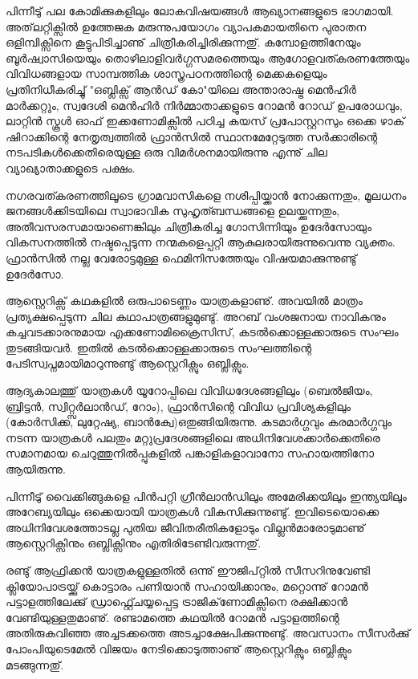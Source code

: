 പിന്നീടു് പല കോമിക്കുകളിലും ലോകവിഷയങ്ങള്‍ ആഖ്യാനങ്ങളുടെ ഭാഗമായി. അത്‌ലറ്റിക്സില്‍ ഉത്തേജക 
മരുന്നുപയോഗം വ്യാപകമായതിനെ പുരാതന ഒളിമ്പിക്സിനെ കൂട്ടുപിടിച്ചാണു് ചിത്രീകരിച്ചിരിക്കുന്നതു്. കമ്പോളത്തിനേയും 
ബൂര്‍ഷ്വാസിയെയും തൊഴിലാളിവര്‍ഗ്ഗസമരത്തെയും ആഗോളവത്കരണത്തേയും വിവിധങ്ങളായ സാമ്പത്തിക 
ശാസ്ത്രപഠനത്തിന്റെ മെക്കകളെയും പ്രതിനിധീകരിച്ചു് "ഒബ്ലിക്സ് ആന്‍ഡ് കോ"യിലെ അന്താരാഷ്ട്ര മെന്‍ഹിര്‍ മാര്‍ക്കറ്റും, 
സ്വദേശി മെന്‍ഹിര്‍ നിര്‍മ്മാതാക്കളുടെ റോമന്‍ റോഡ് ഉപരോധവും, ലാറ്റിന്‍ സ്കൂള്‍ ഓഫ് ഇക്കണോമിക്സില്‍ പഠിച്ച കയസ് 
പ്രപോസ്റ്ററസും ഒക്കെ ഴാക് ഷിറാക്കിന്റെ നേതൃത്വത്തില്‍ ഫ്രാന്‍സില്‍ സ്ഥാനമേറ്റേടുത്ത സര്‍ക്കാരിന്റെ 
നടപടികള്‍ക്കെതിരെയുള്ള ഒരു വിമര്‍ശനമായിരുന്നു എന്നു് ചില വ്യാഖ്യാതാക്കളുടെ പക്ഷം.

നഗരവത്കരണത്തിലൂടെ ഗ്രാമവാസികളെ നശിപ്പിയ്ക്കാന്‍ നോക്കുന്നതും, മൂലധനം ജനങ്ങള്‍ക്കിടയിലെ സ്വാഭാവിക 
സുഹൃത്ബന്ധങ്ങളെ ഉലയ്ക്കുന്നതും, അതീവസരസമായാണെങ്കിലും ചിത്രീകരിച്ച ഗോസിന്നിയും ഉദേര്‍സോയും 
വികസനത്തില്‍ നഷ്ടപ്പെടുന്ന നന്മകളെപ്പറ്റി ആകുലരായിരുന്നുവെന്നു വ്യക്തം. ഫ്രാന്‍സില്‍ നല്ല വേരോട്ടമുള്ള 
ഫെമിനിസത്തേയും വിഷയമാക്കുന്നുണ്ടു് ഉദേര്‍സോ.

ആസ്റ്റെറിക്സ് കഥകളില്‍ ഒരുപാടെണ്ണം യാത്രകളാണു്. അവയില്‍ മാത്രം പ്രത്യക്ഷപ്പെടുന്ന ചില കഥാപാത്രങ്ങളുമുണ്ടു്. 
അറബ് വംശജനായ നാവികനും കച്ചവടക്കാരനുമായ എക്കണോമിക്രൈസിസ്, കടല്‍ക്കൊള്ളക്കാരുടെ സംഘം 
തുടങ്ങിയവര്‍. ഇതില്‍ കടല്‍ക്കൊള്ളക്കാരുടെ സംഘത്തിന്റെ പേടിസ്വപ്നമായിമാറുന്നുണ്ടു് ആസ്റ്റെറിക്സും ഒബ്ലിക്സും.

ആദ്യകാലത്തു് യാത്രകള്‍ യൂറോപ്പിലെ വിവിധദേശങ്ങളിലും (ബെല്‍ജിയം, ബ്രിട്ടന്‍, സ്വിറ്റ്സര്‍ലാന്‍ഡ്, റോം), ഫ്രാന്‍സിന്റെ 
വിവിധ പ്രവിശ്യകളിലും (കോര്‍സിക്ക, ലുറ്റേഷ്യ, ബാന്‍ക്വേ)ഒതുങ്ങിയിരുന്നു. കടമാര്‍ഗ്ഗവും കരമാര്‍ഗ്ഗവും നടന്ന യാത്രകള്‍ പലതും മറ്റുപ്രദേശങ്ങളിലെ 
അധിനിവേശക്കാര്‍ക്കെതിരെ സമാനമായ ചെറുത്തുനില്‍പ്പുകളില്‍ പങ്കാളികളാവാനോ സഹായത്തിനോ ആയിരുന്നു.

പിന്നീടു് വൈക്കിങ്ങുകളെ പിന്‍പറ്റി ഗ്രീന്‍ലാന്‍ഡിലും അമേരിക്കയിലും ഇന്ത്യയിലും അറേബ്യയിലും ഒക്കെയായി 
യാത്രകള്‍ വികസിക്കുന്നുണ്ടു്. ഇവിടെയൊക്കെ അധിനിവേശത്തോടല്ല പുതിയ ജീവിതരീതികളോടും 
വില്ലന്‍മാരോടുമാണു് ആസ്റ്റെറിക്സിനും ഒബ്ലിക്സിനും എതിരിടേണ്ടിവരുന്നതു്.

രണ്ടു് ആഫ്രിക്കന്‍ യാത്രകളുള്ളതില്‍ ഒന്നു് ഈജിപ്റ്റില്‍ സീസറിനുവേണ്ടി ക്ലിയോപാട്രയ്ക്കു് കൊട്ടാരം പണിയാന്‍ 
സഹായിക്കാനും, മറ്റൊന്നു് റോമന്‍ പട്ടാളത്തിലേക്കു് ഡ്രാഫ്റ്റ്ചെയ്യപ്പെട്ട ട്രാജിക്‌ണോമിക്സിനെ രക്ഷിക്കാന്‍ 
വേണ്ടിയുള്ളതുമാണു്. രണ്ടാമത്തെ കഥയില്‍ റോമന്‍ പട്ടാളത്തിന്റെ അതിരുകവിഞ്ഞ അച്ചടക്കത്തെ 
അടച്ചാക്ഷേപിക്കുന്നുണ്ടു്. അവസാനം സീസര്‍ക്കു് പോംപിയുടെമേല്‍ വിജയം നേടിക്കൊടുത്താണു് ആസ്റ്റെറിക്സും ഒബ്ലിക്സും 
മടങ്ങുന്നതു്.

